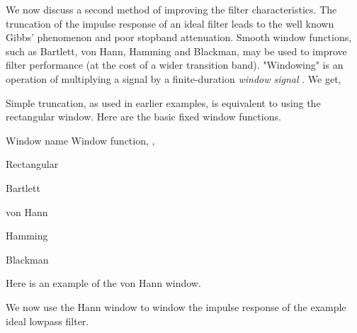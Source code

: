 \documentclass{article}
\begin{document}
\begin{CellGroup}


We now discuss a second method of improving the filter characteristics. The truncation of the impulse response of an ideal filter leads to the well
known Gibbs' phenomenon and poor stopband attenuation. Smooth window functions, such as Bartlett, von Hann, Hamming and Blackman, may be used to
improve filter performance (at the cost of a wider transition band). "Windowing" is an operation of multiplying a signal  by
a finite-duration {\itshape window signal} . We get,






Simple truncation, as used in earlier examples, is equivalent to using the rectangular window. Here are the basic fixed window functions.

	Window name			Window function, , 

	Rectangular			

	Bartlett			

	von Hann			

	Hamming			

	Blackman			



Here is an example of the von Hann window.

We now use the Hann window to window the impulse response of the example ideal lowpass filter.


\end{CellGroup}
\end{document}
